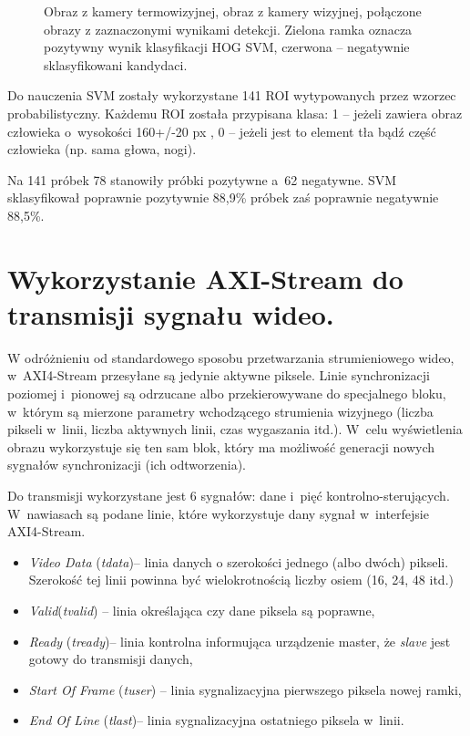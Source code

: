\begin{figure}[h]
\caption[Detekcja]{\protect{} Obraz z kamery termowizyjnej, \protect{} obraz z kamery wizyjnej, \protect{} połączone obrazy z zaznaczonymi wynikami detekcji. Zielona ramka oznacza pozytywny wynik klasyfikacji HOG SVM, czerwona -- negatywnie sklasyfikowani kandydaci.}
\end{figure}

Do nauczenia SVM zostały wykorzystane 141 ROI wytypowanych przez wzorzec probabilistyczny. 
Każdemu ROI została przypisana klasa: 1 -- jeżeli zawiera obraz człowieka o~wysokości 160+/-20 px , 0 -- jeżeli jest to element tła bądź część człowieka (np. sama głowa, nogi).

Na 141 próbek 78 stanowiły próbki pozytywne a~62 negatywne. 
SVM sklasyfikował poprawnie pozytywnie 88,9\% próbek zaś poprawnie negatywnie 88,5\%.


\section{Wykorzystanie AXI-Stream do transmisji sygnału wideo.}

W odróżnieniu od standardowego sposobu przetwarzania strumieniowego wideo, w~AXI4-Stream przesyłane są jedynie aktywne piksele.
Linie synchronizacji poziomej i~pionowej są odrzucane albo przekierowywane do specjalnego bloku, w~którym są mierzone parametry wchodzącego strumienia wizyjnego (liczba pikseli w~linii, liczba aktywnych linii, czas wygaszania itd.).
W~celu wyświetlenia obrazu wykorzystuje się ten sam blok, który ma możliwość generacji nowych sygnałów synchronizacji (ich odtworzenia).

Do transmisji wykorzystane jest 6 sygnałów: dane i~pięć kontrolno-sterujących. 
W~nawiasach są podane linie, które wykorzystuje dany sygnał w~interfejsie AXI4-Stream.
\begin{itemize}
\item \textit{Video Data} (\textit{tdata})-- linia danych o szerokości jednego (albo dwóch) pikseli. Szerokość tej linii powinna być wielokrotnością liczby osiem (16, 24, 48 itd.)
\item \textit{Valid}(\textit{tvalid}) -- linia określająca czy dane piksela są poprawne,
\item \textit{Ready} (\textit{tready})-- linia kontrolna informująca urządzenie master, że \textit{slave} jest gotowy do transmisji danych, 
\item \textit{Start Of Frame} (\textit{tuser}) -- linia sygnalizacyjna pierwszego piksela nowej ramki,
\item \textit{End Of Line} (\textit{tlast})-- linia sygnalizacyjna ostatniego piksela w~linii. 
\end{itemize}

